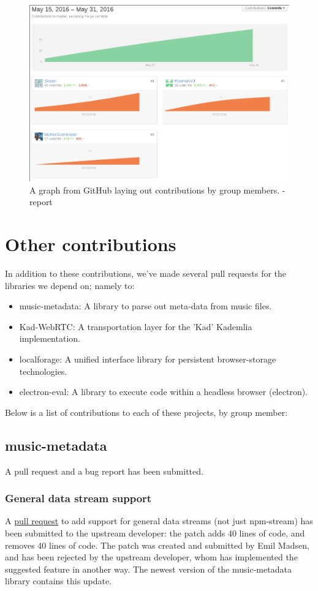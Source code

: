 \begin{figure}[H]
  \centering
    \includegraphics[width=\linewidth]{gfx/report}
    \caption{A graph from GitHub laying out contributions by group members. - report}
  \label{fig:report}
\end{figure}

\section{Other contributions}
In addition to these contributions, we've made several pull requests for the
libraries we depend on; namely to:
\begin{itemize}
\item music-metadata: A library to parse out meta-data from music files.
\item Kad-WebRTC: A transportation layer for the 'Kad' Kademlia implementation.
\item localforage: A unified interface library for persistent browser-storage
    technologies.
\item electron-eval: A library to execute code within a headless browser
    (electron).
\end{itemize}

Below is a list of contributions to each of these projects, by group member:
\subsection{music-metadata}
A pull request and a bug report has been submitted.

\subsubsection{General data stream support}
A \href{https://github.com/leetreveil/musicmetadata/pull/114}{pull request} to
add support for general data streams (not just npm-stream) has been submitted
to the upstream developer: the patch adds 40 lines of code, and removes 40
lines of code.
\newline\newline
The patch was created and submitted by Emil Madsen, and has been rejected by
the upstream developer, whom has implemented the suggested feature in another
way. The newest version of the music-metadata library contains this update.

